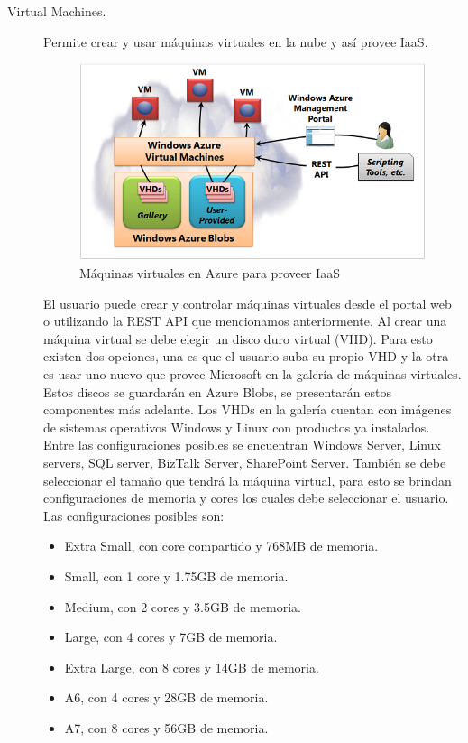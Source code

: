 \begin{description}
\item [Virtual Machines.] Permite crear y usar máquinas virtuales en la nube y así provee IaaS.

\begin{figure}[h!]
    \centering
    \includegraphics[width=\columnwidth, keepaspectratio]{_imagenes/azure_virtualmachines}
    \caption{Máquinas virtuales en Azure para proveer IaaS} \label{fig:azure_virtualmachines}
\end{figure}

El usuario puede crear y controlar máquinas virtuales desde el portal web o utilizando la REST API que mencionamos anteriormente. Al crear  una máquina virtual se debe elegir un disco duro virtual (VHD). Para esto existen dos opciones, una es que el usuario suba su propio VHD y la otra es usar uno nuevo que provee Microsoft en la galería de máquinas virtuales. Estos discos se guardarán en  Azure Blobs, se presentarán estos componentes más adelante. Los VHDs en la galería cuentan con imágenes de sistemas operativos Windows y Linux con productos ya instalados. Entre las configuraciones posibles se encuentran Windows Server, Linux servers, SQL server, BizTalk Server, SharePoint Server. También se debe seleccionar el tamaño que tendrá la máquina virtual, para esto se brindan configuraciones de memoria y cores los cuales debe seleccionar el usuario. Las configuraciones posibles son:

\begin{itemize}
\item Extra Small, con core compartido y  768MB de memoria.
\item Small, con 1 core y 1.75GB de memoria.
\item Medium, con 2 cores y 3.5GB de memoria.
\item Large, con 4 cores y 7GB de memoria.
\item Extra Large, con 8 cores y 14GB de memoria.
\item A6, con 4 cores y 28GB de memoria.
\item A7, con 8 cores y 56GB de memoria.


\end{itemize}
\end{description}
